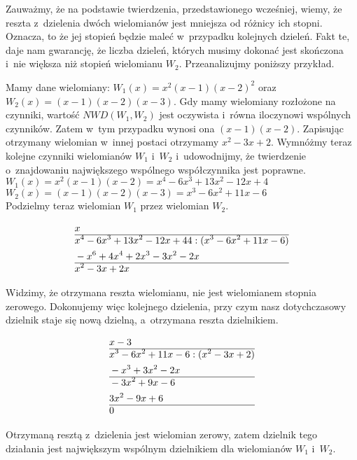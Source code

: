 Zauważmy, że na podstawie twierdzenia, przedstawionego wcześniej, wiemy, że reszta z~dzielenia dwóch wielomianów jest mniejsza od różnicy ich stopni. Oznacza, to że jej stopień będzie maleć w~przypadku kolejnych dzieleń. Fakt te, daje nam gwarancję, że liczba dzieleń, których musimy dokonać jest skończona i~nie większa niż stopień wielomianu $W_2$. Przeanalizujmy poniższy przykład.

\begin{example}
	$ $\\
	Mamy dane wielomiany: $W_1(x) = x^2(x-1)(x-2)^2$ oraz $W_2(x) = (x-1)(x-2)(x-3)$. Gdy mamy wielomiany rozłożone na czynniki, wartość $NWD(W_1, W_2)$ jest oczywista i~równa iloczynowi wspólnych czynników. Zatem w~tym przypadku wynosi ona $(x-1)(x-2)$. Zapisując otrzymany wielomian w~innej postaci otrzymamy $x^2-3x+2$. Wymnóżmy teraz kolejne czynniki wielomianów $W_1$ i~$W_2$ i~udowodnijmy, że twierdzenie o~znajdowaniu największego wspólnego współczynnika jest poprawne. \\
	$W_1(x) = x^2(x-1)(x-2) = x^4-6x^3+13x^2-12x+4$ \\
	$W_2(x) = (x-1)(x-2)(x-3) = x^3-6x^2+11x-6$ \\
	Podzielmy teraz wielomian $W_1$ przez wielomian $W_2$.
	
	\begin{equation*}
	\begin{split}
&x\\\hline
&x^4-6x^3+13x^2-12x+44 : (x^3-6x^2+11x-6) \\
&-x^6+4x^4+2x^3-3x^2-2x \\\hline
&x^2-3x+2x
	\end{split}
	\end{equation*}
	
	Widzimy, że otrzymana reszta wielomianu, nie jest wielomianem stopnia zerowego. Dokonujemy więc kolejnego dzielenia, przy czym nasz dotychczasowy dzielnik staje się nową dzielną, a~otrzymana reszta dzielnikiem.
	
	\begin{equation*}
	\begin{split}
	&x-3\\\hline
	&x^3-6x^2+11x-6 : (x^2-3x+2) \\
	&-x^3+3x^2-2x \\\hline
	&-3x^2+9x-6 \\
	&3x^2-9x+6  \\\hline
	&0
	\end{split}
	\end{equation*}
	
	Otrzymaną resztą z~dzielenia jest wielomian zerowy, zatem dzielnik tego działania jest największym wspólnym dzielnikiem dla wielomianów $W_1$ i~$W_2$.
\end{example}

